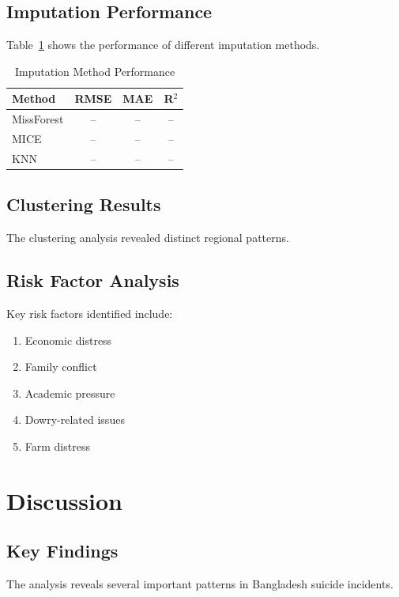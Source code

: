 \documentclass[12pt,a4paper]{article}
\begin{document}
\subsection{Imputation Performance}
Table~\ref{tab:imputation} shows the performance of different imputation methods.

\begin{table}[H]
\centering
\caption{Imputation Method Performance}
\label{tab:imputation}
\begin{tabular}{@{}lccc@{}}
\toprule
\textbf{Method} & \textbf{RMSE} & \textbf{MAE} & \textbf{R$^2$} \\
\midrule
MissForest & -- & -- & -- \\
MICE & -- & -- & -- \\
KNN & -- & -- & -- \\
\bottomrule
\end{tabular}
\end{table}

\subsection{Clustering Results}
The clustering analysis revealed distinct regional patterns.

\subsection{Risk Factor Analysis}
Key risk factors identified include:
\begin{enumerate}
    \item Economic distress
    \item Family conflict
    \item Academic pressure
    \item Dowry-related issues
    \item Farm distress
\end{enumerate}

\section{Discussion}

\subsection{Key Findings}
The analysis reveals several important patterns in Bangladesh suicide incidents.
\end{document}
